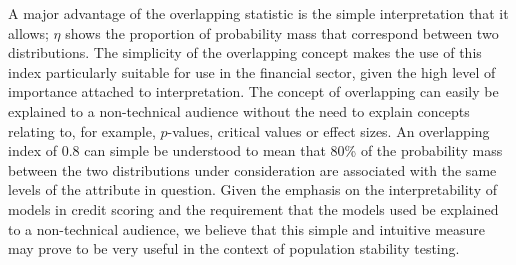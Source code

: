 \documentclass{article}
\theoremstyle{def}
\begin{document}
A major advantage of the overlapping statistic is the simple interpretation that it allows; $\eta$ shows the proportion of probability mass that correspond between two distributions. The simplicity of the overlapping concept makes the use of this index particularly suitable for use in the financial sector, given the high level of importance attached to interpretation. The concept of overlapping can easily be explained to a non-technical audience without the need to explain concepts relating to, for example, $p$-values, critical values or effect sizes.
An overlapping index of 0.8 can simple be understood to mean that 80\% of the probability mass between the two distributions under consideration are associated with the same levels of the attribute in question.
Given the emphasis on the interpretability of models in credit scoring and the requirement that the models used be explained to a non-technical audience, we believe that this simple and intuitive measure may prove to be very useful in the context of population stability testing.






\end{document}
